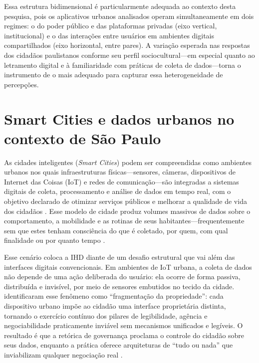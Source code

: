 \documentclass[
	12pt,				%
	oneside,			%
	a4paper,			%
	english,			%
	brazil				%
	]{abntex2ppgsi}
\begin{document}
    Essa estrutura bidimensional é particularmente adequada ao contexto desta pesquisa, pois os aplicativos urbanos analisados operam simultaneamente em dois regimes: o do poder público e das plataformas privadas (eixo vertical, institucional) e o das interações entre usuários em ambientes digitais compartilhados (eixo horizontal, entre pares). A variação esperada nas respostas dos cidadãos paulistanos conforme seu perfil sociocultural---em especial quanto ao letramento digital e à familiaridade com práticas de coleta de dados---torna o instrumento de  o mais adequado para capturar essa heterogeneidade de percepções.


    \section{Smart Cities e dados urbanos no contexto de São Paulo}

    As cidades inteligentes (\textit{Smart Cities}) podem ser compreendidas como ambientes urbanos nos quais infraestruturas físicas---sensores, câmeras, dispositivos de Internet das Coisas (IoT) e redes de comunicação---são integradas a sistemas digitais de coleta, processamento e análise de dados em tempo real, com o objetivo declarado de otimizar serviços públicos e melhorar a qualidade de vida dos cidadãos \cite{Mashhadi2014}. Esse modelo de cidade produz volumes massivos de dados sobre o comportamento, a mobilidade e as rotinas de seus habitantes---frequentemente sem que estes tenham consciência do que é coletado, por quem, com qual finalidade ou por quanto tempo \cite{Chowdhury2016}.

    Esse cenário coloca a IHD diante de um desafio estrutural que vai além das interfaces digitais convencionais. Em ambientes de IoT urbana, a coleta de dados não depende de uma ação deliberada do usuário: ela ocorre de forma passiva, distribuída e invisível, por meio de sensores embutidos no tecido da cidade.  identificaram esse fenômeno como ``fragmentação da propriedade'': cada dispositivo urbano impõe ao cidadão uma interface proprietária distinta, tornando o exercício contínuo dos pilares de legibilidade, agência e negociabilidade praticamente inviável sem mecanismos unificados e legíveis. O resultado é que a retórica de governança proclama o controle do cidadão sobre seus dados, enquanto a prática oferece arquiteturas de ``tudo ou nada'' que inviabilizam qualquer negociação real \cite{Chowdhury2016}.
\end{document}
